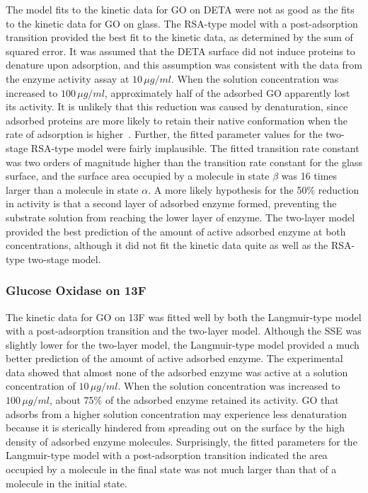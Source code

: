 The model fits to the kinetic data for GO on DETA were not as good
as the fits to the kinetic data for GO on glass. The RSA-type model
with a post-adsorption transition provided the best fit to the kinetic
data, as determined by the sum of squared error. It was assumed that
the DETA surface did not induce proteins to denature upon adsorption,
and this assumption was consistent with the data from the enzyme activity
assay at $10\,\mu g/ml$. When the solution concentration was increased
to $100\,\mu g/ml$, approximately half of the adsorbed GO apparently
lost its activity. It is unlikely that this reduction was caused by
denaturation, since adsorbed proteins are more likely to retain their
native conformation when the rate of adsorption is higher~\cite{Latour2005}.
Further, the fitted parameter values for the two-stage RSA-type model
were fairly implausible. The fitted transition rate constant was two
orders of magnitude higher than the transition rate constant for the
glass surface, and the surface area occupied by a molecule in state
$\beta$ was 16 times larger than a molecule in state $\alpha$. A
more likely hypothesis for the 50\% reduction in activity is that
a second layer of adsorbed enzyme formed, preventing the substrate
solution from reaching the lower layer of enzyme. The two-layer model
provided the best prediction of the amount of active adsorbed enzyme
at both concentrations, although it did not fit the kinetic data quite
as well as the RSA-type two-stage model. 


\subsubsection{Glucose Oxidase on 13F}

The kinetic data for GO on 13F was fitted well by both the Langmuir-type
model with a post-adsorption transition and the two-layer model. Although
the SSE was slightly lower for the two-layer model, the Langmuir-type
model provided a much better prediction of the amount of active adsorbed
enzyme. The experimental data showed that almost none of the adsorbed
enzyme was active at a solution concentration of $10\,\mu g/ml$.
When the solution concentration was increased to $100\,\mu g/ml$,
about 75\% of the adsorbed enzyme retained its activity. GO that adsorbs
from a higher solution concentration may experience less denaturation
because it is sterically hindered from spreading out on the surface
by the high density of adsorbed enzyme molecules. Surprisingly, the
fitted parameters for the Langmuir-type model with a post-adsorption
transition indicated the area occupied by a molecule in the final
state was not much larger than that of a molecule in the initial state.


